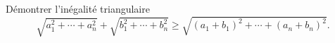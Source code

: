 Démontrer l'inégalité triangulaire
\[ \sqrt{a_1^2 + \cdots + a_n^2} + \sqrt{b_1^2 + \cdots + b_n^2} \geq \sqrt{(a_1 + b_1)^2 + \cdots + (a_n + b_n)^2}. \]
